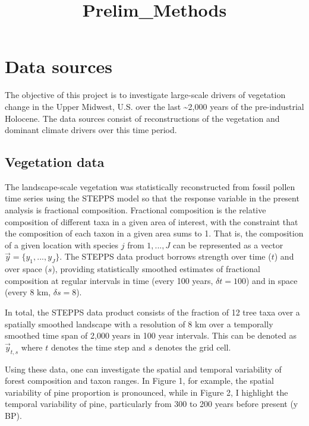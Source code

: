 \documentclass[11pt]{article}
\title{Prelim\_Methods}
\begin{document}
    
    \maketitle
    
    

    
    \hypertarget{data-sources}{%
\section{Data sources}\label{data-sources}}

The objective of this project is to investigate large-scale drivers of
vegetation change in the Upper Midwest, U.S. over the last
\textasciitilde2,000 years of the pre-industrial Holocene. The data
sources consist of reconstructions of the vegetation and dominant
climate drivers over this time period.

\hypertarget{vegetation-data}{%
\subsection{Vegetation data}\label{vegetation-data}}

The landscape-scale vegetation was statistically reconstructed from
fossil pollen time series using the STEPPS model so that the response
variable in the present analysis is fractional composition. Fractional
composition is the relative composition of different taxa in a given
area of interest, with the constraint that the composition of each taxon
in a given area sums to 1. That is, the composition of a given location
with species \(j\) from \(1, ..., J\) can be represented as a vector
\(\vec{y} = \{y_1,...,y_J\}\). The STEPPS data product borrows strength
over time (\(t\)) and over space (\(s\)), providing statistically
smoothed estimates of fractional composition at regular intervals in
time (every 100 years, \(\delta t = 100\)) and in space (every 8 km,
\(\delta s = 8\)).

In total, the STEPPS data product consists of the fraction of 12 tree
taxa over a spatially smoothed landscape with a resolution of 8 km over
a temporally smoothed time span of 2,000 years in 100 year intervals.
This can be denoted as \(\vec{y}_{t,s}\) where \(t\) denotes the time
step and \(s\) denotes the grid cell.

Using these data, one can investigate the spatial and temporal
variability of forest composition and taxon ranges. In Figure 1, for
example, the spatial variability of pine proportion is pronounced, while
in Figure 2, I highlight the temporal variability of pine, particularly
from 300 to 200 years before present (y BP).
 
\end{document}
